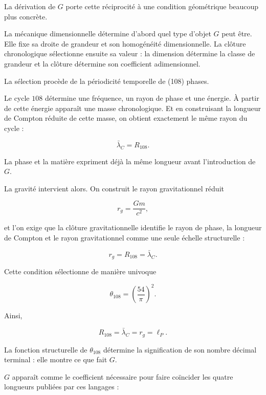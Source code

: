 La dérivation de \(G\) porte cette réciprocité à une condition géométrique beaucoup plus concrète.\par

La mécanique dimensionnelle détermine d’abord quel type d’objet \(G\) peut être. Elle fixe sa droite de grandeur et son homogénéité dimensionnelle. La clôture chronologique sélectionne ensuite sa valeur : la dimension détermine la classe de grandeur et la clôture détermine son coefficient adimensionnel.\par

La sélection procède de la périodicité temporelle de (108) phases.\par

Le cycle \(108\) détermine une fréquence, un rayon de phase et une énergie. À partir de cette énergie apparaît une masse chronologique. Et en construisant la longueur de Compton réduite de cette masse, on obtient exactement le même rayon du cycle :\par

\[
\bar\lambda_C=R_{108}.
\]

La phase et la matière expriment déjà la même longueur avant l’introduction de \(G\).\par

La gravité intervient alors. On construit le rayon gravitationnel réduit\par

\[
r_g=\frac{Gm}{c^2},
\]

et l’on exige que la clôture gravitationnelle identifie le rayon de phase, la longueur de Compton et le rayon gravitationnel comme une seule échelle structurelle :\par

\[
r_g=R_{108}=\bar\lambda_C.
\]

Cette condition sélectionne de manière univoque\par

\[
\theta_{108}
=
\left(\frac{54}{\pi}\right)^2.
\]

Ainsi,\par

\[
R_{108}
=
\bar\lambda_C
=
r_g
=
\ell_P.
\]

La fonction structurelle de \(\theta_{108}\) détermine la signification de son nombre décimal terminal : elle montre ce que fait \(G\).\par

\(G\) apparaît comme le coefficient nécessaire pour faire coïncider les quatre longueurs publiées par ces langages :\par

